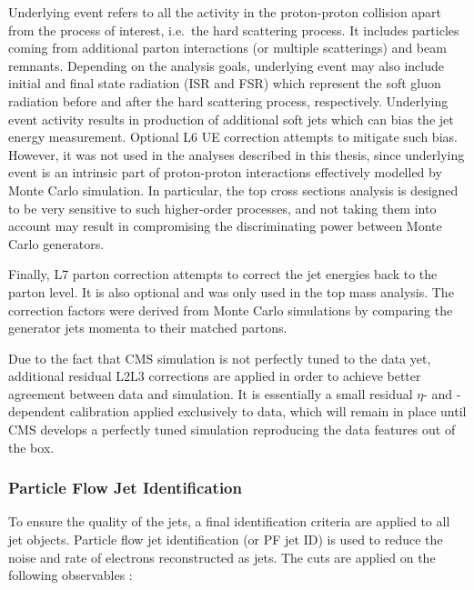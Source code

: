 Underlying event \cite{underlying_event} refers to all the activity in the proton-proton collision apart from the
process of interest, i.e.\ the hard scattering process. It includes particles coming from additional parton interactions
(or multiple scatterings) and beam remnants. Depending on the analysis goals, underlying event may also include initial
and final state radiation (ISR and FSR) which represent the soft gluon radiation before and after the hard scattering
process, respectively. Underlying event activity results in production of additional soft jets which can bias the jet
energy measurement. Optional L6 UE correction attempts to mitigate such bias. However, it was not used in the analyses
described in this thesis, since underlying event is an intrinsic part of proton-proton interactions effectively modelled
by Monte Carlo simulation. In particular, the top cross sections analysis is designed to be very sensitive to such
higher-order processes, and not taking them into account may result in compromising the discriminating power between
Monte Carlo generators.

Finally, L7 parton correction attempts to correct the jet energies back to the parton level. It is also optional and was
only used in the top mass analysis. The correction factors were derived from Monte Carlo simulations by comparing the
generator jets momenta to their matched partons.

Due to the fact that CMS simulation is not perfectly tuned to the data yet, additional residual L2L3 corrections are
applied in order to achieve better agreement between data and simulation. It is essentially a small residual $\eta$- and
\pt-dependent calibration applied exclusively to data, which will remain in place until CMS develops a perfectly tuned
simulation reproducing the data features out of the box.



\subsubsection{Particle Flow Jet Identification}
\label{sss:PFJet_ID}
To ensure the quality of the jets, a final identification criteria are applied to all jet objects. Particle flow jet
identification (or PF jet ID) is used to reduce the noise and rate of electrons reconstructed as jets. The cuts are
applied on the following observables :

